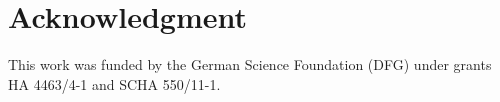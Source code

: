 \documentclass[conference]{IEEEtran}
\renewcommand{\baselinestretch}{0.94}
\begin{document}
%
\IEEEpeerreviewmaketitle

%

%
%
%

%

%

%

\section*{Acknowledgment}
This work was funded by the German Science Foundation (DFG) under grants HA 4463\slash4-1 and SCHA 550/11-1.
\renewcommand{\baselinestretch}{1} 
\footnotesize


\end{document}
